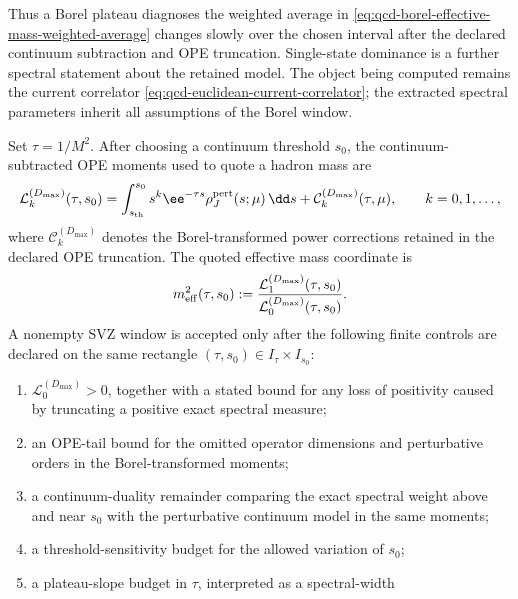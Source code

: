 Thus a Borel plateau diagnoses the weighted average in
\eqref{eq:qcd-borel-effective-mass-weighted-average} changes slowly over the
chosen interval after the declared continuum subtraction and OPE truncation.
Single-state dominance is a further spectral statement about the retained
model.  The object being computed remains the current correlator
\eqref{eq:qcd-euclidean-current-correlator}; the extracted spectral parameters
inherit all assumptions of the Borel window.

\begin{controlledapproximation}
\label{ca:qcd-svz-duality-stability-gate}
Set \(\tau=1/M^2\).  After choosing a continuum threshold \(s_0\), the
continuum-subtracted OPE moments used to quote a hadron mass are
\begin{equation}
  \mathcal L_k^{(D_{\max})}(\tau,s_0)
  =
  \int_{s_{\rm th}}^{s_0}
  s^k \ee^{-\tau s}\rho_J^{\rm pert}(s;\mu)\,\dd s
  +
  \mathcal C_k^{(D_{\max})}(\tau,\mu),
  \qquad k=0,1,\dots ,
  \label{eq:qcd-svz-continuum-subtracted-moments}
\end{equation}
where \(\mathcal C_k^{(D_{\max})}\) denotes the Borel-transformed power
corrections retained in the declared OPE truncation.  The quoted effective
mass coordinate is
\begin{equation}
  m_{\rm eff}^2(\tau,s_0)
  :=
  \frac{\mathcal L_1^{(D_{\max})}(\tau,s_0)}
       {\mathcal L_0^{(D_{\max})}(\tau,s_0)} .
  \label{eq:qcd-svz-effective-mass-coordinate}
\end{equation}
A nonempty SVZ window is accepted only after the following finite controls are
declared on the same rectangle
\((\tau,s_0)\in I_\tau\times I_{s_0}\):
\begin{enumerate}
  \item \(\mathcal L_0^{(D_{\max})}>0\), together with a stated bound for any
  loss of positivity caused by truncating a positive exact spectral measure;
  \item an OPE-tail bound for the omitted operator dimensions and perturbative
  orders in the Borel-transformed moments;
  \item a continuum-duality remainder comparing the exact spectral weight above
  and near \(s_0\) with the perturbative continuum model in the same moments;
  \item a threshold-sensitivity budget for the allowed variation of \(s_0\);
  \item a plateau-slope budget in \(\tau\), interpreted as a spectral-width

\end{enumerate}
\end{controlledapproximation}
